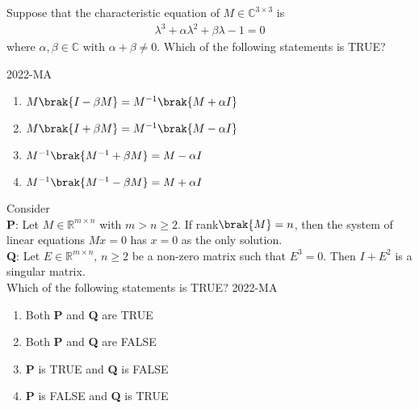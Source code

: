 \iffalse
\section{ma}
\chapter{2022}
\author{ai24btech11036}
\fi



\item Suppose that the characteristic equation of $M \in \mathbb{C}^{3 \times 3}$ is 
	\begin{align*}
		\lambda^{3}+\alpha \lambda^{2} + \beta \lambda -1=0
	\end{align*}
where $\alpha, \beta \in \mathbb{C}$ with $\alpha+\beta \neq 0$. Which of the following statements is TRUE?
		
		\hfill{2022-MA}
	\begin{enumerate}
		\item $M\brak{I-\beta M}=M^{-1} \brak{M+ \alpha I}$
		\item $M\brak{I+\beta M}=M^{-1} \brak{M- \alpha I}$
		\item $M^{-1}\brak{M^{-1}+\beta M}=M-\alpha I$
		\item $M^{-1}\brak{M^{-1}-\beta M}=M+\alpha I$
	\end{enumerate}

\item Consider \\
\textbf{P}: Let $M \in \mathbb{R}^{m \times n}$ with $m>n\geq 2$. If rank$\brak{M}=n$, then the system of linear equations $Mx=0$ has $x=0$ as the only solution. \\
\textbf{Q}: Let $E \in \mathbb{R}^{m \times n}$, $n\geq 2$ be a non-zero matrix such that $E^{3}=0$. Then $I+E^2$ is a singular matrix. \\
Which of the following statements is TRUE?
\hfill{2022-MA}

	\begin{enumerate}
		\item Both \textbf{P} and \textbf{Q} are TRUE
		\item Both \textbf{P} and \textbf{Q} are FALSE
		\item \textbf{P} is TRUE and \textbf{Q} is FALSE
		\item \textbf{P} is FALSE and \textbf{Q} is TRUE
	\end{enumerate}

